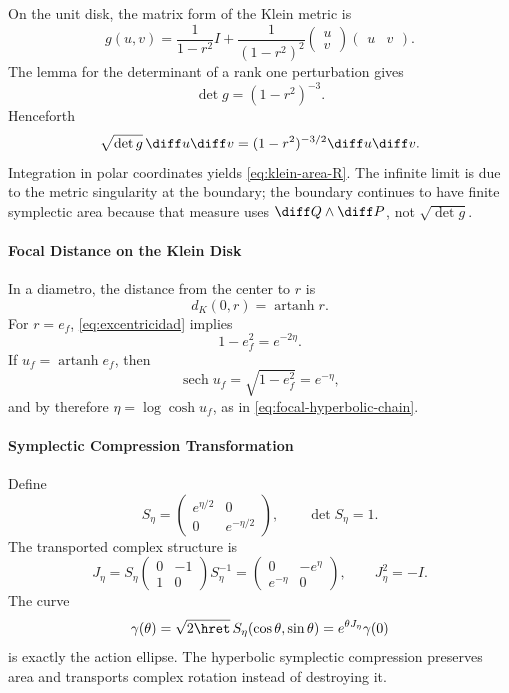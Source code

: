 On the unit disk, the matrix form of the Klein metric is
\[
g(u,v)=\frac1{1-r^2}I
+\frac1{(1-r^2)^2}
\begin{pmatrix}u\\v\end{pmatrix}
\begin{pmatrix}u&v\end{pmatrix}.
\]
The lemma for the determinant of a rank one perturbation gives
\[
\det g=(1-r^2)^{-3}.
\]
Henceforth
\[
\sqrt{\det g}\,\diff u\diff v
=(1-r^2)^{-3/2}\diff u\diff v.
\]
Integration in polar coordinates yields \eqref{eq:klein-area-R}. The infinite limit is
due to the metric singularity at the boundary; the boundary continues to have
finite symplectic area because that measure uses \(\diff Q\wedge\diff P\),
not \(\sqrt{\det g}\).

\paragraph{Focal Distance on the Klein Disk}

In a diametro, the distance from the center to \(r\) is
\[
d_K(0,r)=\operatorname{artanh}r.
\]
For \(r=e_f\), \eqref{eq:excentricidad} implies
\[
1-e_f^2=e^{-2\eta}.
\]
If \(u_f=\operatorname{artanh}e_f\), then
\[
\operatorname{sech}u_f=\sqrt{1-e_f^2}=e^{-\eta},
\]
and by therefore \(\eta=\log\cosh u_f\), as in
\eqref{eq:focal-hyperbolic-chain}.

\paragraph{Symplectic Compression Transformation}

Define
\begin{equation}
S_\eta=
\begin{pmatrix}e^{\eta/2}&0\\0&e^{-\eta/2}\end{pmatrix},
\qquad \det S_\eta=1.
\label{eq:compresión simpléctica}
\end{equation}
The transported complex structure is
\begin{equation}
J_\eta=S_\eta
\begin{pmatrix}0&-1\\1&0\end{pmatrix}
S_\eta^{-1}
=\begin{pmatrix}0&-e^\eta\\e^{-\eta}&0\end{pmatrix},
\qquad J_\eta^2=-I.
\label{eq:Jeta}
\end{equation}
The curve
\[
\gamma(\theta)=\sqrt{2\hret}\,
S_\eta(\cos\theta,\sin\theta)
=e^{\theta J_\eta}\gamma(0)
\]
is exactly the action ellipse. The hyperbolic symplectic compression preserves area and
transports complex rotation instead of destroying it.

